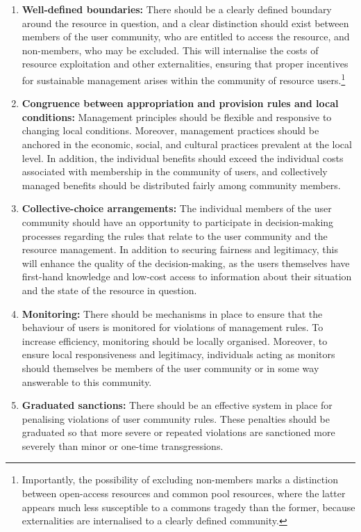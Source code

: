 \begin{enumerate}
\item {\bf Well-defined boundaries:} There should be a clearly defined boundary around the resource in question, and a clear distinction should exist between members of the user community, who are entitled to access the resource, and non-members, who may be excluded. This will internalise the costs of resource exploitation and other externalities, ensuring that proper incentives for sustainable management arises within the community of resource users.\footnote{Importantly, the possibility of excluding non-members marks a distinction between open-access resources and common pool resources, where the latter appears much less susceptible to a commons tragedy than the former, because externalities are internalised to a clearly defined community.}
\item {\bf Congruence between appropriation and provision rules and local conditions:} Management principles should be flexible and responsive to changing local conditions. Moreover, management practices should be anchored in the economic, social, and cultural practices prevalent at the local level. In addition, the individual benefits should exceed the individual costs associated with membership in the community of users, and collectively managed benefits should be distributed fairly among community members.
\item {\bf Collective-choice arrangements:} The individual members of the user community should have an opportunity to participate in decision-making processes regarding the rules that relate to the user community and the resource management. In addition to securing fairness and legitimacy, this will enhance the quality of the decision-making, as the users themselves have first-hand knowledge and low-cost access to information about their situation and the state of the resource in question.
\item {\bf Monitoring:} There should be mechanisms in place to ensure that the behaviour of users is monitored for violations of management rules. To increase efficiency, monitoring should be locally organised. Moreover, to ensure local responsiveness and legitimacy, individuals acting as monitors should themselves be members of the user community or in some way answerable to this community.
\item {\bf Graduated sanctions:} There should be an effective system in place for penalising violations of user community rules. These penalties should be graduated so that more severe or repeated violations are sanctioned more severely than minor or one-time transgressions.  

\end{enumerate}
